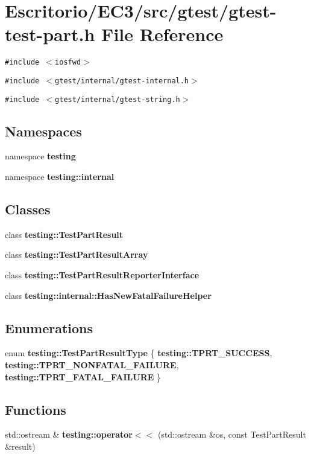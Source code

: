 \section{Escritorio/EC3/src/gtest/gtest-test-part.h File Reference}
\label{gtest-test-part_8h}
{\tt \#include $<$iosfwd$>$}\par
{\tt \#include $<$gtest/internal/gtest-internal.h$>$}\par
{\tt \#include $<$gtest/internal/gtest-string.h$>$}\par
\subsection*{Namespaces}
\begin{CompactItemize}
\item 
namespace {\bf testing}
\item 
namespace {\bf testing::internal}
\end{CompactItemize}
\subsection*{Classes}
\begin{CompactItemize}
\item 
class {\bf testing::TestPartResult}
\item 
class {\bf testing::TestPartResultArray}
\item 
class {\bf testing::TestPartResultReporterInterface}
\item 
class {\bf testing::internal::HasNewFatalFailureHelper}
\end{CompactItemize}
\subsection*{Enumerations}
\begin{CompactItemize}
\item 
enum {\bf testing::TestPartResultType} \{ {\bf testing::TPRT\_\-SUCCESS}, 
{\bf testing::TPRT\_\-NONFATAL\_\-FAILURE}, 
{\bf testing::TPRT\_\-FATAL\_\-FAILURE}
 \}
\end{CompactItemize}
\subsection*{Functions}
\begin{CompactItemize}
\item 
std::ostream \& {\bf testing::operator$<$$<$} (std::ostream \&os, const TestPartResult \&result)
\end{CompactItemize}

